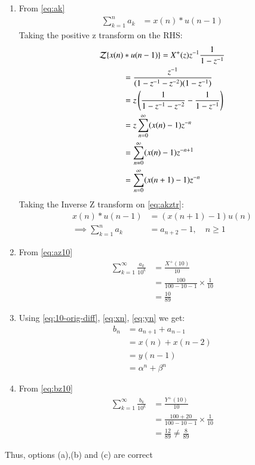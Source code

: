 \documentclass[journal,12pt,twocolumn]{IEEEtran}
\renewcommand\thesection{\arabic{section}}
\begin{document}
\begin{enumerate}[label=\thesection.\arabic*,ref=\thesection.\theenumi]
\begin{enumerate}[a]
    \item From \eqref{eq:ak}
    \begin{align}
        \sum_{k=1}^na_k &= x(n)*u(n-1)
    \end{align}
    Taking the positive z transform on the RHS:
    \begin{align}
        \mathcal{Z}\{x(n)&*u(n-1)\} = X^+(z)z^{-1}\frac{1}{1-z^{-1}}\\
        &= \frac{z^{-1}}{(1-z^{-1}-z^{-2})(1-z^{-1})}\\
        &= z\left(\frac{1}{1-z^{-1}-z^{-2}} - \frac{1}{1-z^{-1}}\right)\\
        &= z\sum_{n=0}^\infty (x(n)-1)z^{-n}\\
        &= \sum_{n=0}^\infty (x(n)-1)z^{-n+1}\\
        &= \sum_{n=0}^\infty (x(n+1)-1)z^{-n} \label{eq:akztr}
    \end{align}
    Taking the Inverse Z transform on \eqref{eq:akztr}:
    \begin{align}
        x(n)*u(n-1) &= (x(n+1)-1)u(n)\\
        \implies  \sum_{k=1}^na_k &= a_{n+2}-1,\quad n\geq1
    \end{align}
    
\item  From \eqref{eq:az10}
\begin{align}
    \sum_{k=1}^\infty\frac{a_k}{10^k} &= \frac{X^+(10)}{10}\\
    &= \frac{100}{100-10-1}\times\frac{1}{10}\\
    &= \frac{10}{89}
\end{align}
\item Using \eqref{eq:10-orig-diff}, \eqref{eq:xn}, \eqref{eq:yn} we get:
\begin{align}
    b_n &= a_{n+1}+a_{n-1}\\
    &= x(n)+x(n-2)\\
    &= y(n-1)\\
    &= \alpha^n+\beta^n
\end{align}
\item  From \eqref{eq:bz10}
\begin{align}
    \sum_{k=1}^\infty\frac{b_k}{10^k} &= \frac{Y^+(10)}{10}\\
    &= \frac{100+20}{100-10-1}\times\frac{1}{10}\\
    &= \frac{12}{89} \neq \frac{8}{89}
\end{align}
\end{enumerate}
Thus, options (a),(b) and (c) are correct
\end{enumerate}
\end{document}
